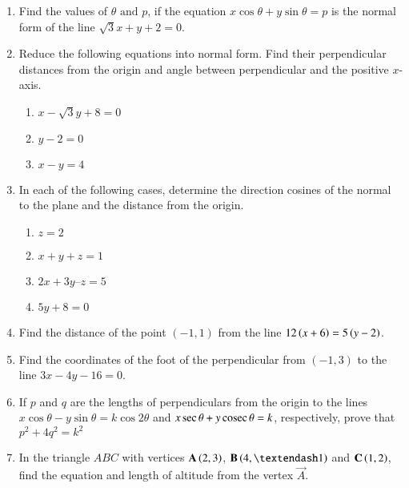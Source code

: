 \begin{enumerate}[label=\thesubsection.\arabic*,ref=\thesubsection.\theenumi]
	\item Find the values of $\theta \text{ and } p$, if the equation $x\cos\theta+y\sin\theta=p$ is the normal form
of the line $\sqrt{3}x+y+2=0$.
\\
\solution
		
\item  Reduce the following equations into normal form. Find their perpendicular distances from the origin and angle between perpendicular and the positive $x$-axis.
\label{chapters/11/10/3/3}
\begin{enumerate}
	\item $x-\sqrt{3}y+8=0$ 
	\item $y-2=0$
	\item $x-y=4$
\end{enumerate}
\solution

 \item  In each of the following cases, determine the direction cosines of the normal to
the plane and the distance from the origin.
\begin{enumerate}
	\item $z=2$ 
	\item $x + y + z = 1$
	\item $2x + 3y – z = 5$
	\item $5y + 8 = 0$
\end{enumerate}
    \solution
		
\item Find the distance of the point $(-1,1)$ from the line $12\left(x+6\right) = 5\left(y-2\right)$. 
\label{chapters/11/10/3/4}
	\\
\solution 

\item Find the coordinates of the foot of the perpendicular from $(-1, 3)$ to the line $3x-4y-16=0$.  
\label{chapters/11/10/3/14}
\\
\solution

\item  If ${p}$ and ${q}$ are the lengths of perpendiculars from the origin to the lines ${x}\cos\theta - {y}\sin\theta =  {k}\cos2\theta$ and ${x}\sec\theta + {y}\,\text{cosec}\,\theta = {k}$, respectively, prove that ${p}^2 + 4{q}^2 = {k}^2$
\label{chapters/11/10/3/16}
\\
\solution

\item In the triangle $ABC$ with vertices $\mathbf{A} \left(2, 3\right)$, $\vec{B} \brak{4, –1}$ and $\mathbf{C} \left(1, 2\right)$, find the equation and length of altitude from the vertex $\vec{A}$.

\end{enumerate}
